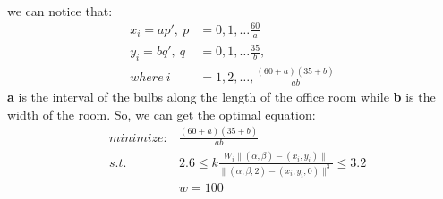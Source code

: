 \documentclass[11pt]{article}
\begin{document}
\paragraph{\color{red}{Answer:}}
  we can notice that: \\
  \begin{align*}
    x_i = ap',\ p &= 0,1,\dots \frac{60}{a} \\
    y_i = bq',\ q &= 0,1,\dots \frac{35}{b},\\
    where \ i &= 1,2,\dots, \frac{(60 + a)(35 + b)}{ab}
  \end{align*}
\textbf{a} is the interval of the bulbs along the length of the office room while
\textbf{b} is the width of the room. So, we can get the optimal equation: \\
\begin{align*}
  &minimize:  &\frac{(60 + a)(35 + b)}{ab}  \\
  &s.t.       &2.6 \leq k\frac{W_i \parallel(\alpha,\beta) - (x_i, y_i)\parallel}{\parallel(\alpha,\beta,2) - (x_i, y_i,0)\parallel^3} \leq 3.2 \\
  &           &w = 100 \\
\end{align*}
\end{document}
